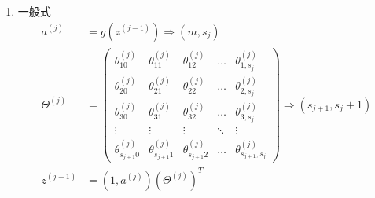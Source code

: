 \begin{enumerate}
\item 一般式
\begin{equation}\begin{aligned}
	a^{(j)} &= g(z^{(j-1)}) \Rightarrow {(m,s_j)} \\
	\Theta^{(j)} &= 
		\left(\begin{matrix}
			\theta_{10}^{(j)} & \theta_{11}^{(j)} & \theta_{12}^{(j)} & \dots & \theta_{1,s_{j}}^{(j)} \\
			\theta_{20}^{(j)} & \theta_{21}^{(j)} & \theta_{22}^{(j)} & \dots & \theta_{2,s_{j}}^{(j)} \\
			\theta_{30}^{(j)} & \theta_{31}^{(j)} & \theta_{32}^{(j)} & \dots & \theta_{3,s_{j}}^{(j)} \\
			\vdots    & \vdots    & \vdots    & \ddots & \vdots   \\
			\theta_{s_{j+1}0}^{(j)} & \theta_{s_{j+1}1}^{(j)} & \theta_{s_{j+1}2}^{(j)} & \dots & \theta_{s_{j+1},s_{j}}^{(j)}
		\end{matrix}\right) \Rightarrow {(s_{j+1},s_{j}+1)}\\
	z^{(j+1)} &= (1, a^{(j)}) (\Theta^{(j)})^T \\

\end{aligned}
\end{equation}
\end{enumerate}

